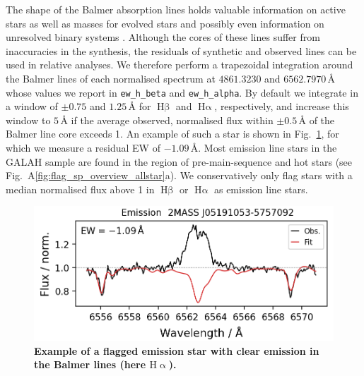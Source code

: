 \documentclass[
  journal=pasa,
  manuscript=research-paper, %
  year=2024,
  volume=37
]{cup-journal}
\begin{document}
The shape of the Balmer absorption lines holds valuable information on active stars as well as masses for evolved stars \citep{Bergemann2016} and possibly even information on unresolved binary systems \citep{Sayeed2024}. Although the cores of these lines suffer from inaccuracies in the synthesis, the residuals of synthetic and observed lines can be used in relative analyses. We therefore perform a trapezoidal integration around the Balmer lines of each normalised spectrum at $4861.3230$ and $6562.7970\,\text{\AA}$ whose values we report in \texttt{ew\_h\_beta} and \texttt{ew\_h\_alpha}. By default we integrate in a window of $\pm 0.75$ and $1.25\,\text{\AA}$ for $\text{H} \upbeta$ and $\text{H} \upalpha$, respectively, and increase this window to $5\,\text{\AA}$ if the average observed, normalised flux within $\pm 0.5\,\text{\AA}$ of the Balmer line core exceeds 1. An example of such a star is shown in Fig.~\ref{fig:examples_flag_sp_1}, for which we measure a residual EW of $-1.09\,\text{\AA}$. Most emission line stars in the GALAH sample are found in the region of pre-main-sequence and hot stars (see Fig.~A\ref{fig:flag_sp_overview_allstar}a). We conservatively only flag stars with a median normalised flux above 1 in $\text{H} \upbeta$ or $\text{H} \upalpha$ as emission line stars.

\begin{figure}[ht]
 \centering
 \includegraphics[width=\textwidth]{figures/examples_flag_sp_1.png}
 \caption{\textbf{Example of a flagged emission star with clear emission in the Balmer lines (here $\mathrm{H\upalpha}$).}}
 \label{fig:examples_flag_sp_1}
\end{figure}
\end{document}
